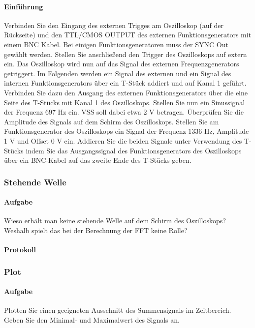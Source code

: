 \documentclass[10pt]{report}
\begin{document}
        \paragraph{Einführung}
        Verbinden Sie den Eingang des externen Trigges am Oszilloskop (auf der Rückseite) und
        den \glqq{}TTL/CMOS OUTPUT\grqq{} des externen Funktionsgenerators mit einem BNC Kabel.
        Bei einigen Funktionsgeneratoren muss der \glqq{}SYNC Out\grqq{} gewählt werden. Stellen Sie
        anschließend den Trigger des Oszilloskops auf \glqq{}extern\grqq{} ein. Das Oszilloskop wird nun auf
        das Signal des externen Frequenzgenerators getriggert.
        Im Folgenden werden ein Signal des externen und ein Signal des internen Funktionsgenerators
        über ein T-Stück addiert und auf Kanal 1 geführt.
        Verbinden Sie dazu den Ausgang des externen Funktionsgenerators über die eine Seite
        des T-Stücks mit Kanal 1 des Oszilloskops. Stellen Sie nun ein Sinussignal der Frequenz
        697 Hz ein. VSS soll dabei etwa 2 V betragen. Überprüfen Sie die Amplitude des Signals
        auf dem Schirm des Oszilloskops.
        Stellen Sie am Funktionsgenerator des Oszilloskops ein Signal der Frequenz 1336 Hz,
        Amplitude 1 V und Offset 0 V ein. Addieren Sie die beiden Signale unter Verwendung des
        T-Stücks indem Sie das Ausgangssignal des Funktionsgenerators des Oszilloskops über
        ein BNC-Kabel auf das zweite Ende des T-Stücks geben.

        \subsubsection{Stehende Welle}
        \paragraph{Aufgabe}
        Wieso erhält man keine stehende Welle auf dem Schirm des Oszilloskops? Weshalb
        spielt das bei der Berechnung der FFT keine Rolle?
        \paragraph{Protokoll}


        \subsubsection{Plot}
        \paragraph{Aufgabe}
        Plotten Sie einen geeigneten Ausschnitt des Summensignals im Zeitbereich. Geben
        Sie den Minimal- und Maximalwert des Signals an.
\end{document}
